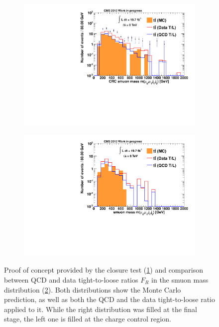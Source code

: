 \begin{figure}
  \centering
  \begin{subfigure}[b]{0.495\textwidth}
    \centering
    \includegraphics[width=\textwidth]{plots/closure_proof.pdf}
    \caption{\label{fig:closureproof}}
  \end{subfigure}
  \begin{subfigure}[b]{0.495\textwidth}
    \centering
    \includegraphics[width=\textwidth]{plots/closure_test.pdf}
    \caption{\label{fig:closurecomparison}}
  \end{subfigure}

  \caption{Proof of concept provided by the closure test (\ref{fig:closureproof}) and comparison between QCD and data tight-to-loose ratios $F_R$ in the smuon mass distribution (\ref{fig:closurecomparison}). Both distributions show the Monte Carlo prediction, as well as both the QCD and the data tight-to-loose ratio applied to it. While the right distribution was filled at the final stage, the left one is filled at the charge control region.}
  \label{fig:closuretest}
\end{figure}

